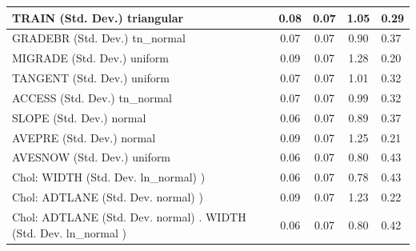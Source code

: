 \begin{table}
\begin{center}
\begin{tabular}{|l|l|c|c|c|l|}
			\hline
			TRAIN (Std. Dev.) triangular &  & 0.08 & 0.07 & 1.05 & 0.29 \\
			\hline
			GRADEBR (Std. Dev.) tn_normal &  & 0.07 & 0.07 & 0.90 & 0.37 \\
			\hline
			MIGRADE (Std. Dev.) uniform &  & 0.09 & 0.07 & 1.28 & 0.20 \\
			\hline
			TANGENT (Std. Dev.) uniform &  & 0.07 & 0.07 & 1.01 & 0.32 \\
			\hline
			ACCESS (Std. Dev.) tn_normal &  & 0.07 & 0.07 & 0.99 & 0.32 \\
			\hline
			SLOPE (Std. Dev.) normal &  & 0.06 & 0.07 & 0.89 & 0.37 \\
			\hline
			AVEPRE (Std. Dev.) normal &  & 0.09 & 0.07 & 1.25 & 0.21 \\
			\hline
			AVESNOW (Std. Dev.) uniform &  & 0.06 & 0.07 & 0.80 & 0.43 \\
			\hline
			 Chol: WIDTH (Std. Dev. ln_normal) ) &  & 0.06 & 0.07 & 0.78 & 0.43 \\
			\hline
			 Chol: ADTLANE (Std. Dev. normal) ) &  & 0.09 & 0.07 & 1.23 & 0.22 \\
			\hline
			 Chol: ADTLANE (Std. Dev. normal) . WIDTH (Std. Dev.   ln_normal ) &  & 0.06 & 0.07 & 0.80 & 0.42 \\
			\hline
		\end{tabular}
	\end{center}
\end{table}